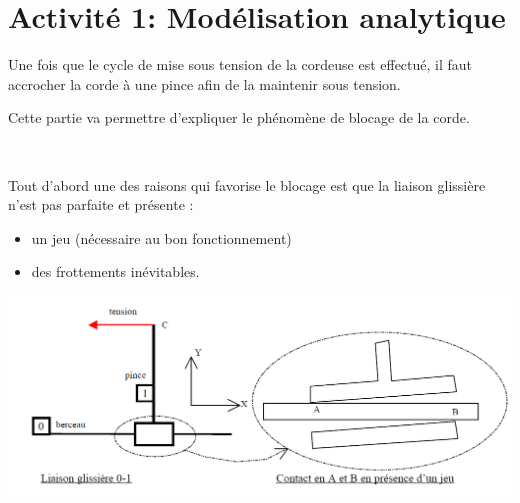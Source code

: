 

\section{Activité 1: Modélisation analytique}

Une fois que le cycle de mise sous tension de la cordeuse est effectué, il faut accrocher la corde à une pince afin de la maintenir sous tension.

Cette partie va permettre d'expliquer le phénomène de blocage de la corde.

~\

 \begin{minipage}{0.58\linewidth}
Tout d'abord une des raisons qui favorise le blocage est que la liaison glissière n'est pas parfaite et présente :
 \begin{itemize}
  \item un jeu (nécessaire au bon fonctionnement)
  \item des frottements inévitables.
 \end{itemize}
 \end{minipage}
 \hfill
  \begin{minipage}{0.4\linewidth}
   \centering\includegraphics[width=\linewidth]{img/cordeuse_arc.png}
  \end{minipage}

~\

